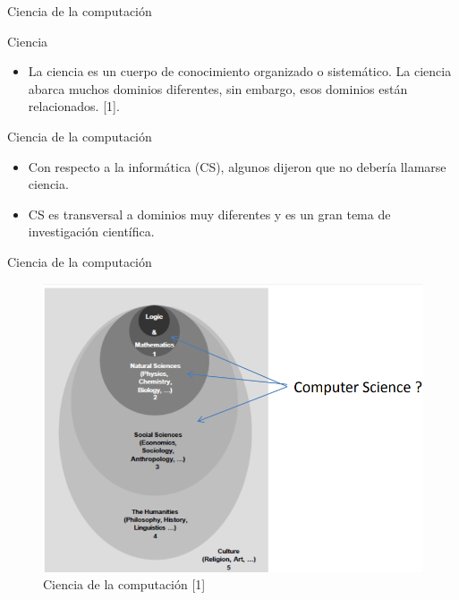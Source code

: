 \begin{frame}{Ciencia de la computación}


\begin{block}{Ciencia}
\begin{itemize}
    \item La ciencia es un cuerpo de conocimiento organizado o sistemático. La ciencia abarca muchos dominios diferentes, sin embargo, esos dominios están relacionados. [1].
\end{itemize}
\end{block} 
        
\begin{block}{Ciencia de la computación}
\begin{itemize}
     \item Con respecto a la informática (CS), algunos dijeron que no debería llamarse ciencia.
    \item CS es transversal a dominios muy diferentes y es un gran tema de investigación científica.
\end{itemize}
\end{block}   
        

\end{frame}

\begin{frame}{Ciencia de la computación}
\begin{figure}[H]
    \includegraphics[scale=0.4]{images/figura1.PNG}
    \caption{Ciencia de la computación [1]}
    \label{fig:boat1}
\end{figure} 
\end{frame}

